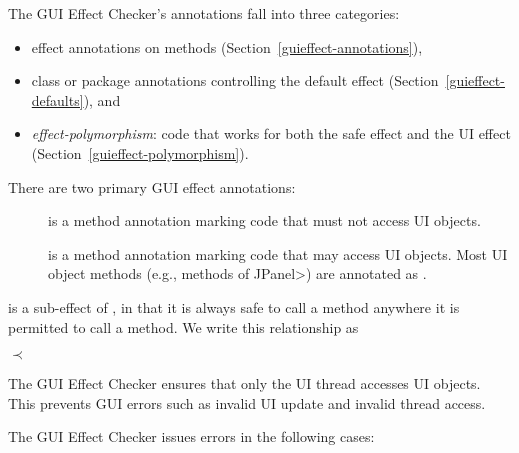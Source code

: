 
The GUI Effect Checker's annotations fall into three categories:

\begin{itemize}
\item
  effect annotations on methods (Section~\ref{guieffect-annotations}),
\item
 class or package annotations controlling the default effect (Section~\ref{guieffect-defaults}), and
\item
  \emph{effect-polymorphism}:  code that works for both the safe effect and
  the UI effect (Section~\ref{guieffect-polymorphism}).
\end{itemize}



There are two primary GUI effect annotations:
\begin{description}
\item[]
  is a method annotation marking code that must not
  access UI objects.
\item[]
  is a method annotation marking code that may access
  UI objects.  Most UI object methods (e.g., methods of \<JPanel>) are
  annotated as .
\end{description}

 is a sub-effect of , in that it is always safe to
call a  method anywhere it is permitted to call a
 method.  We write this relationship as

\centerline{ $\prec$ }



The GUI Effect Checker ensures that only the UI thread accesses UI objects.
This prevents GUI errors such
as invalid UI update and invalid thread access.

The GUI Effect Checker issues errors in the following cases:


